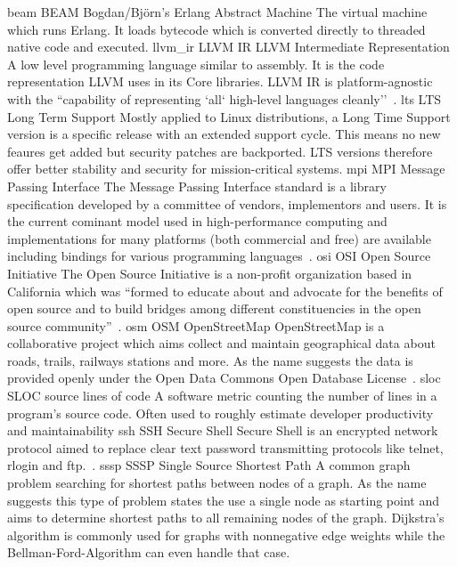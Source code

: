 \newdualentry
{beam}
{BEAM}
{Bogdan/Bj\"orn's Erlang Abstract Machine}
{The virtual machine which runs Erlang. It loads bytecode which is converted directly to threaded native code and executed.}
\newdualentry
{llvm_ir}
{LLVM IR}
{LLVM Intermediate Representation}
{A low level programming language similar to assembly. It is the code representation LLVM uses in its Core libraries. LLVM IR is platform-agnostic with the ``capability of representing `all` high-level languages cleanly''~\cite{llvm_ir_ref}.}
\newdualentry
{lts}
{LTS}
{Long Term Support}
{Mostly applied to Linux distributions, a Long Time Support version is a specific release with an extended support cycle. This means no new feaures get added but security patches are backported. LTS versions therefore offer better stability and security for mission-critical systems.}
\newdualentry
{mpi}
{MPI}
{Message Passing Interface}
{The Message Passing Interface standard is a library specification developed by a committee of vendors, implementors and users. It is the current cominant model used in high-performance computing and implementations for many platforms (both commercial and free) are available including bindings for various programming languages~\cite{mpi_main, mpi_infiniband}.}
\newdualentry
{osi}
{OSI}
{Open Source Initiative}
{The Open Source Initiative is a non-profit organization based in California which was ``formed to educate about and advocate for the benefits of open source and to build bridges among different constituencies in the open source community''~\cite{osi_about}.}
\newdualentry
{osm}
{OSM}
{OpenStreetMap}
{OpenStreetMap is a collaborative project which aims collect and maintain geographical data about roads, trails, railways stations and more. As the name suggests the data is provided openly under the Open Data Commons Open Database License~.}
\newdualentry
{sloc}
{SLOC}
{source lines of code}
{A software metric counting the number of lines in a program's source code. Often used to roughly estimate developer productivity and maintainability}
\newdualentry
{ssh}
{SSH}
{Secure Shell}
{Secure Shell is an encrypted network protocol aimed to replace clear text password transmitting protocols like telnet, rlogin and ftp.~\cite{open_ssh}.}
\newdualentry
{sssp}
{SSSP}
{Single Source Shortest Path}
{A common graph problem searching for shortest paths between nodes of a graph. As the name suggests this type of problem states the use a single node as starting point and aims to determine shortest paths to all remaining nodes of the graph. Dijkstra's algorithm is commonly used for graphs with nonnegative edge weights while the Bellman-Ford-Algorithm can even handle that case.}
